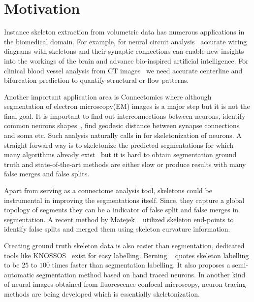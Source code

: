 \section{Motivation}
Instance skeleton extraction from volumetric data has numerous applications in the biomedical domain. For example, for neural circuit analysis~\cite{zheng2018complete} accurate wiring diagrams with skeletons and their synaptic connections can enable new insights into the workings of the brain and advance bio-inspired artificial intelligence. For clinical blood vessel analysis from CT images~\cite{Tetteh2018} we need accurate centerline and bifurcation prediction to quantify structural or flow patterns.

Another important application area is Connectomics \cite{Turaga2010, Funke2019, Kisuk2017} where although segmentation of electron microscopy(EM) images is a major step but it is not the final goal. It is important to find out interconnections between neurons, identify common neurons shapes~\cite{Zhao2014}, find geodesic distance between synapse connections and soma etc. Such analysis naturally calls in for skeletonization of neurons. A straight forward way is to skeletonize the predicted segmentations for which many algorithms already exist~\cite{TEASAR, Palagyi2014} but it is hard to obtain segmentation ground truth and state-of-the-art methods are either slow or produce results with many false merges and false splits. %

Apart from serving as a connectome analysis tool, skeletons could be instrumental in improving the segmentations itself. Since, they capture a global topology of segments they can be a indicator of false split and false merges in segmentation. A recent method by Matejek \etall~\cite{Brain2019} utilized skeleton end-points to identify false splits and merged them using skeleton curvature information.

Creating ground truth skeleton data is also easier than segmentation, dedicated tools like KNOSSOS~\cite{KNOSSOS} exist for easy labelling. Berning \etall~\cite{Berning2015} quotes skeleton labelling to be $25$ to $100$ times faster than segmentation labelling. It also proposes a semi-automatic segmentation method based on hand traced neurons. In another kind of neural images obtained from fluorescence confocal microscopy, neuron tracing methods \cite{Kayasandik2018} are being developed which is essentially skeletonization.

